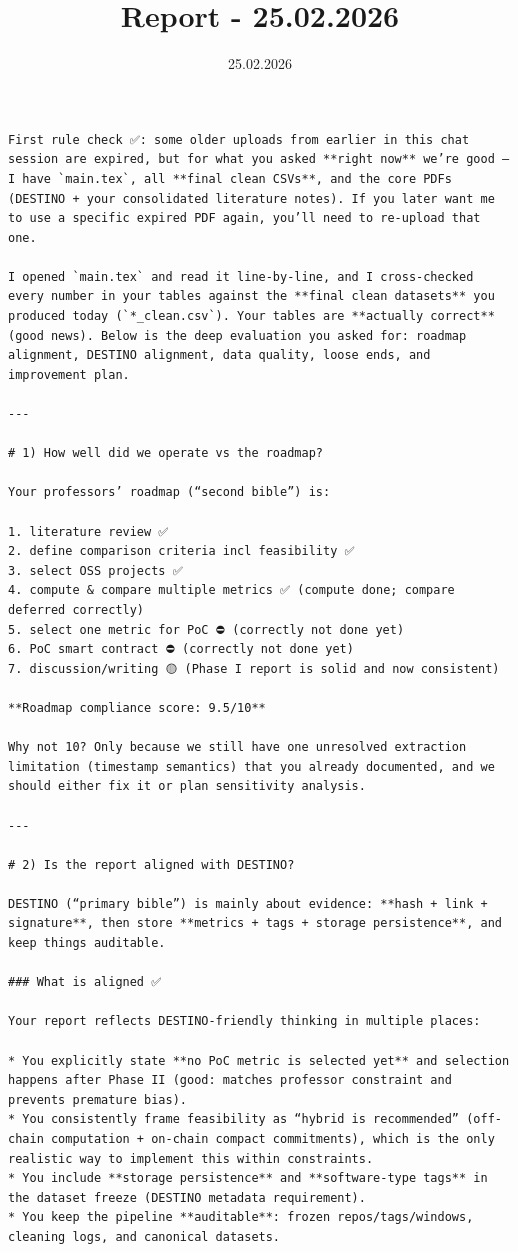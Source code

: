 \documentclass[11pt,a4paper]{article}
\title{Report - 25.02.2026}
\date{25.02.2026}
\begin{document}
\maketitle

\begin{verbatim}
First rule check ✅: some older uploads from earlier in this chat session are expired, but for what you asked **right now** we’re good — I have `main.tex`, all **final clean CSVs**, and the core PDFs (DESTINO + your consolidated literature notes). If you later want me to use a specific expired PDF again, you’ll need to re-upload that one.

I opened `main.tex` and read it line-by-line, and I cross-checked every number in your tables against the **final clean datasets** you produced today (`*_clean.csv`). Your tables are **actually correct** (good news). Below is the deep evaluation you asked for: roadmap alignment, DESTINO alignment, data quality, loose ends, and improvement plan.

---

# 1) How well did we operate vs the roadmap?

Your professors’ roadmap (“second bible”) is:

1. literature review ✅
2. define comparison criteria incl feasibility ✅
3. select OSS projects ✅
4. compute & compare multiple metrics ✅ (compute done; compare deferred correctly)
5. select one metric for PoC ⛔ (correctly not done yet)
6. PoC smart contract ⛔ (correctly not done yet)
7. discussion/writing 🟡 (Phase I report is solid and now consistent)

**Roadmap compliance score: 9.5/10**

Why not 10? Only because we still have one unresolved extraction limitation (timestamp semantics) that you already documented, and we should either fix it or plan sensitivity analysis.

---

# 2) Is the report aligned with DESTINO?

DESTINO (“primary bible”) is mainly about evidence: **hash + link + signature**, then store **metrics + tags + storage persistence**, and keep things auditable.

### What is aligned ✅

Your report reflects DESTINO-friendly thinking in multiple places:

* You explicitly state **no PoC metric is selected yet** and selection happens after Phase II (good: matches professor constraint and prevents premature bias).
* You consistently frame feasibility as “hybrid is recommended” (off-chain computation + on-chain compact commitments), which is the only realistic way to implement this within constraints.
* You include **storage persistence** and **software-type tags** in the dataset freeze (DESTINO metadata requirement).
* You keep the pipeline **auditable**: frozen repos/tags/windows, cleaning logs, and canonical datasets.


\end{verbatim}
\end{document}
